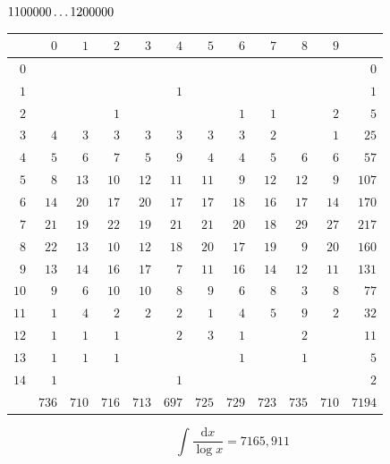 \par\medskip
\noindent\begin{minipage}{\linewidth}\centering
{}
\(1100000\mathinner{.\,.\,.}1200000\)\par\smallskip
\begingroup\fontsize{10.5}{11.5}\selectfont\setlength{\tabcolsep}{3.5pt}\renewcommand{\arraystretch}{1}
\begin{tabular}{r|rrrrrrrrrr|r}\hline
 & $0$ & $1$ & $2$ & $3$ & $4$ & $5$ & $6$ & $7$ & $8$ & $9$ &  \\ \hline
$0$ &  &  &  &  &  &  &  &  &  &  & $0$ \\
$1$ &  &  &  &  & $1$ &  &  &  &  &  & $1$ \\
$2$ &  &  & $1$ &  &  &  & $1$ & $1$ &  & $2$ & $5$ \\
$3$ & $4$ & $3$ & $3$ & $3$ & $3$ & $3$ & $3$ & $2$ &  & $1$ & $25$ \\
$4$ & $5$ & $6$ & $7$ & $5$ & $9$ & $4$ & $4$ & $5$ & $6$ & $6$ & $57$ \\
$5$ & $8$ & $13$ & $10$ & $12$ & $11$ & $11$ & $9$ & $12$ & $12$ & $9$ & $107$ \\
$6$ & $14$ & $20$ & $17$ & $20$ & $17$ & $17$ & $18$ & $16$ & $17$ & $14$ & $170$ \\
$7$ & $21$ & $19$ & $22$ & $19$ & $21$ & $21$ & $20$ & $18$ & $29$ & $27$ & $217$ \\
$8$ & $22$ & $13$ & $10$ & $12$ & $18$ & $20$ & $17$ & $19$ & $9$ & $20$ & $160$ \\
$9$ & $13$ & $14$ & $16$ & $17$ & $7$ & $11$ & $16$ & $14$ & $12$ & $11$ & $131$ \\
$10$ & $9$ & $6$ & $10$ & $10$ & $8$ & $9$ & $6$ & $8$ & $3$ & $8$ & $77$ \\
$11$ & $1$ & $4$ & $2$ & $2$ & $2$ & $1$ & $4$ & $5$ & $9$ & $2$ & $32$ \\
$12$ & $1$ & $1$ & $1$ &  & $2$ & $3$ & $1$ &  & $2$ &  & $11$ \\
$13$ & $1$ & $1$ & $1$ &  &  &  & $1$ &  & $1$ &  & $5$ \\
$14$ & $1$ &  &  &  & $1$ &  &  &  &  &  & $2$ \\
\hline
 & $736$ & $710$ & $716$ & $713$ & $697$ & $725$ & $729$ & $723$ & $735$ & $710$ & $7194$ \\ \hline
\end{tabular}\par\endgroup
\setlength{\abovedisplayskip}{6pt}\setlength{\belowdisplayskip}{4pt}
\[\int\frac{\mathrm{d}x}{\log x}=7165{,}911\]
\end{minipage}

